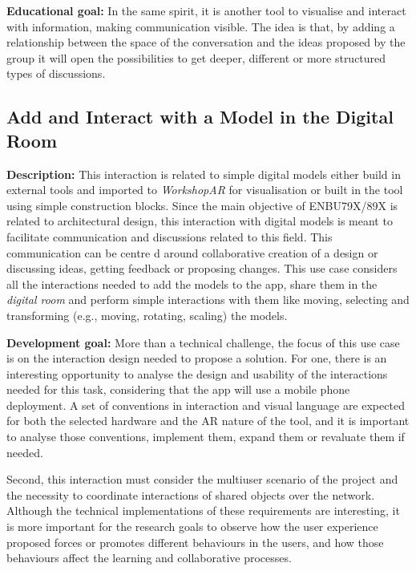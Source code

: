 \noindent
\textbf{Educational goal:} In the same spirit, it is another tool to visualise and interact with information, making communication visible. The idea is that, by adding a
relationship between the space of the conversation and the ideas proposed by the group it will open the possibilities to get deeper, different or more structured types of
discussions.

\subsection{Add and Interact with a Model in the Digital Room \label{sec:4-2-7}}

\textbf{Description:} This interaction is related to simple digital models either build in external tools and imported to \emph{WorkshopAR} for visualisation or built in
the tool using simple construction blocks. Since the main objective of ENBU79X/89X is related to architectural design, this interaction with digital models is meant to
facilitate communication and discussions related to this field. This communication can be centre d around collaborative creation of a design or discussing ideas, getting
feedback or proposing changes. This use case considers all the interactions needed to add the models to the app, share them in the \emph{digital room} and perform simple
interactions with them like moving, selecting and transforming (e.g., moving, rotating, scaling) the models.

\noindent
\textbf{Development goal:} More than a technical challenge, the focus of this use case is on the interaction design needed to propose a solution. For one, there is an
interesting opportunity to analyse the design and usability of the interactions needed for this task, considering that the app will use a mobile phone deployment. A set of
conventions in interaction and visual language are expected for both the selected hardware and the AR nature of the tool, and it is important to analyse those conventions,
implement them, expand them or revaluate them if needed.

Second, this interaction must consider the multiuser scenario of the project and the necessity to coordinate interactions of shared objects over the network. Although the
technical implementations of these requirements are interesting, it is more important for the research goals to observe how the user experience proposed forces or promotes
different behaviours in the users, and how those behaviours affect the learning and collaborative processes.

